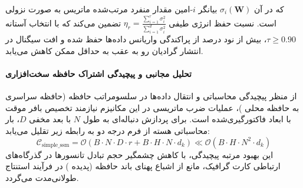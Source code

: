 که در آن $\sigma_i(\mathbf{W})$ بیانگر $i$-امین مقدار منفرد مرتب‌شده ماتریس به صورت نزولی است. نسبت حفظ انرژی طیفی $\eta_r = \frac{\sum_{i=1}^r \sigma_i^2}{\sum_{i=1}^{d} \sigma_i^2}$ تضمین می‌کند که با انتخاب آستانه $\tau \ge 0.90$، بیش از نود درصد از پراکندگی واریانس داده‌ها حفظ شده و افت سیگنال در انتشار گرادیان رو به عقب به حداقل ممکن کاهش می‌یابد.

\paragraph{تحلیل مجانبی و پیچیدگی اشتراک حافظه سخت‌افزاری}
از منظر پیچیدگی محاسباتی و انتقال داده‌ها در سلسومراتب حافظه (حافظه سراسری  به حافظه محلی )، عملیات ضرب ماتریسی در این مکانیزم نیازمند تخصیص بافر موقت با ابعاد فاکتورگیری‌شده است. برای پردازش دنباله‌ای به طول $N$ با بعد مخفی $D$، بار محاسباتی هسته از فرم درجه دو به رابطه زیر تقلیل می‌یابد:
\begin{equation}
\label{eq:complexity_simple_ssm}
\mathcal{C}_{\text{simple\_ssm}} = \mathcal{O}\left( B \cdot N \cdot D \cdot r + B \cdot H \cdot N \cdot d_k \right) \ll \mathcal{O}\left( B \cdot H \cdot N^2 \cdot d_k \right)
\end{equation}
این بهبود مرتبه پیچیدگی، با کاهش چشمگیر حجم تبادل تانسورها در گذرگاه‌های ارتباطی کارت گرافیک، مانع از اشباع پهنای باند حافظه (پدیده ) در فرآیند استنتاج طولانی‌مدت می‌گردد.